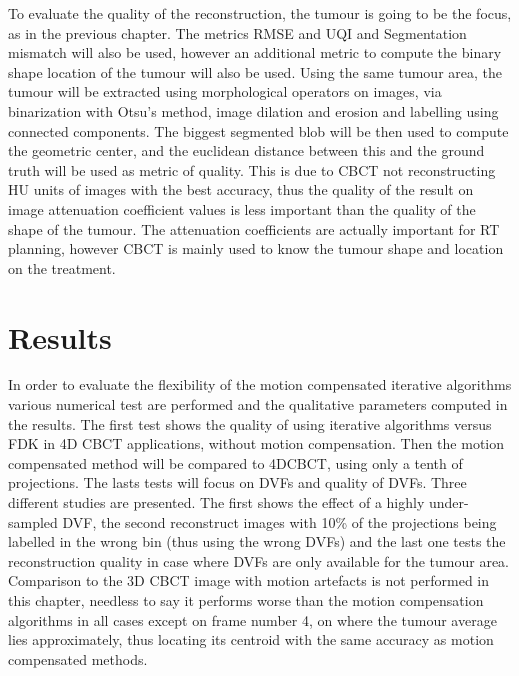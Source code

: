 To evaluate the quality of the reconstruction, the tumour is going to be the focus, as  in the previous chapter. The metrics RMSE and UQI and Segmentation mismatch will also be used, however an additional metric to compute the binary shape location of the tumour will also be used.  Using the same tumour area, the tumour will be extracted using morphological operators on images, via binarization with Otsu's method, image dilation and erosion and labelling using connected components. The biggest segmented blob will be then used to compute the geometric center, and the euclidean distance between this and the ground truth will be used as metric of quality. This is due to CBCT not reconstructing HU units of images with the best accuracy, thus the quality of the result on image attenuation coefficient values is less important than the quality of the shape of the tumour. The attenuation coefficients are actually important for RT planning, however CBCT is mainly used to know the tumour shape and location on the treatment.




\section{Results}

In order to evaluate the flexibility of the motion compensated iterative algorithms various numerical test are performed and the qualitative parameters computed in the results. The first test shows the quality of using iterative algorithms versus FDK in 4D CBCT applications, without motion compensation. Then the motion compensated method will be compared to 4DCBCT, using only a tenth of projections. The lasts tests will focus on DVFs and quality of DVFs. Three different studies are presented. The first shows the effect of a highly under-sampled DVF, the second reconstruct images with 10\% of the projections being labelled in the wrong bin (thus using the wrong DVFs) and the last one tests the reconstruction quality in case where DVFs are only available for the tumour area. Comparison to the 3D CBCT image with motion artefacts is not performed in this chapter, needless to say it performs worse than the motion compensation algorithms in all cases except on frame number 4, on where the tumour average lies approximately, thus locating its centroid with the same accuracy as motion compensated methods.


